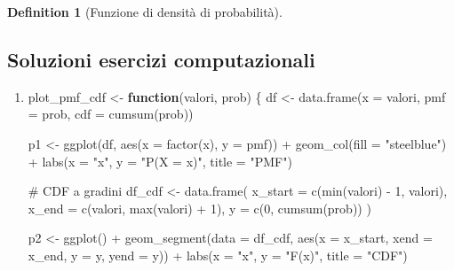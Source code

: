 \documentclass[
  letterpaper,
  DIV=11,
  numbers=noendperiod,
  oneside]{scrreprt}
\newenvironment{Shaded}{\begin{snugshade}}{\end{snugshade}}
\newcommand{\AttributeTok}[1]{\textcolor[rgb]{0.40,0.45,0.13}{#1}}
\newcommand{\CommentTok}[1]{\textcolor[rgb]{0.37,0.37,0.37}{#1}}
\newcommand{\ControlFlowTok}[1]{\textcolor[rgb]{0.00,0.23,0.31}{\textbf{#1}}}
\newcommand{\DecValTok}[1]{\textcolor[rgb]{0.68,0.00,0.00}{#1}}
\newcommand{\FunctionTok}[1]{\textcolor[rgb]{0.28,0.35,0.67}{#1}}
\newcommand{\NormalTok}[1]{\textcolor[rgb]{0.00,0.23,0.31}{#1}}
\newcommand{\OtherTok}[1]{\textcolor[rgb]{0.00,0.23,0.31}{#1}}
\newcommand{\SpecialCharTok}[1]{\textcolor[rgb]{0.37,0.37,0.37}{#1}}
\newcommand{\StringTok}[1]{\textcolor[rgb]{0.13,0.47,0.30}{#1}}
\theoremstyle{definition}
\theoremstyle{plain}
\theoremstyle{definition}
\newtheorem{definition}{Definition}[chapter]
\theoremstyle{remark}
\begin{document}
\begin{definition}[Funzione di densità di
probabilità]
\begin{tcolorbox}
\subsection*{Soluzioni esercizi
computazionali}\label{soluzioni-esercizi-computazionali}

\begin{enumerate}
\def\labelenumi{\arabic{enumi}.}
\setcounter{enumi}{10}
\item
\begin{Shaded}
\begin{Highlighting}[]
\NormalTok{plot\_pmf\_cdf }\OtherTok{\textless{}{-}} \ControlFlowTok{function}\NormalTok{(valori, prob) \{}
\NormalTok{  df }\OtherTok{\textless{}{-}} \FunctionTok{data.frame}\NormalTok{(}\AttributeTok{x =}\NormalTok{ valori, }\AttributeTok{pmf =}\NormalTok{ prob, }\AttributeTok{cdf =} \FunctionTok{cumsum}\NormalTok{(prob))}

\NormalTok{  p1 }\OtherTok{\textless{}{-}} \FunctionTok{ggplot}\NormalTok{(df, }\FunctionTok{aes}\NormalTok{(}\AttributeTok{x =} \FunctionTok{factor}\NormalTok{(x), }\AttributeTok{y =}\NormalTok{ pmf)) }\SpecialCharTok{+}
    \FunctionTok{geom\_col}\NormalTok{(}\AttributeTok{fill =} \StringTok{"steelblue"}\NormalTok{) }\SpecialCharTok{+}
    \FunctionTok{labs}\NormalTok{(}\AttributeTok{x =} \StringTok{"x"}\NormalTok{, }\AttributeTok{y =} \StringTok{"P(X = x)"}\NormalTok{, }\AttributeTok{title =} \StringTok{"PMF"}\NormalTok{)}

  \CommentTok{\# CDF a gradini}
\NormalTok{  df\_cdf }\OtherTok{\textless{}{-}} \FunctionTok{data.frame}\NormalTok{(}
    \AttributeTok{x\_start =} \FunctionTok{c}\NormalTok{(}\FunctionTok{min}\NormalTok{(valori) }\SpecialCharTok{{-}} \DecValTok{1}\NormalTok{, valori),}
    \AttributeTok{x\_end =} \FunctionTok{c}\NormalTok{(valori, }\FunctionTok{max}\NormalTok{(valori) }\SpecialCharTok{+} \DecValTok{1}\NormalTok{),}
    \AttributeTok{y =} \FunctionTok{c}\NormalTok{(}\DecValTok{0}\NormalTok{, }\FunctionTok{cumsum}\NormalTok{(prob))}
\NormalTok{  )}

\NormalTok{  p2 }\OtherTok{\textless{}{-}} \FunctionTok{ggplot}\NormalTok{() }\SpecialCharTok{+}
    \FunctionTok{geom\_segment}\NormalTok{(}\AttributeTok{data =}\NormalTok{ df\_cdf, }
                 \FunctionTok{aes}\NormalTok{(}\AttributeTok{x =}\NormalTok{ x\_start, }\AttributeTok{xend =}\NormalTok{ x\_end, }\AttributeTok{y =}\NormalTok{ y, }\AttributeTok{yend =}\NormalTok{ y)) }\SpecialCharTok{+}
    \FunctionTok{labs}\NormalTok{(}\AttributeTok{x =} \StringTok{"x"}\NormalTok{, }\AttributeTok{y =} \StringTok{"F(x)"}\NormalTok{, }\AttributeTok{title =} \StringTok{"CDF"}\NormalTok{)}


\end{Highlighting}
\end{Shaded}
\end{enumerate}
\end{tcolorbox}
\end{definition}
\end{document}
